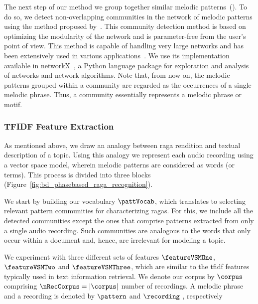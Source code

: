 The next step of our method we group together similar melodic patterns~(). To do so, we detect non-overlapping communities in the network of melodic patterns using the method proposed by~\cite{blondel2008fast}. This community detection method is based on optimizing the modularity of the network and is parameter-free from the user's point of view. This method is capable of handling very large networks and has been extensively used in various applications~\citep{fortunato2010community}. We use its implementation available in networkX~\citep{hagberg-2008-exploring}, a Python language package for exploration and analysis of networks and network algorithms. Note that, from now on, the melodic patterns grouped within a community are regarded as the occurrences of a single melodic phrase. Thus, a community essentially represents a melodic phrase or motif.


\subsubsection{TFIDF Feature Extraction}
\label{sec:vsm_feature_extraction_TFID_computation}

As mentioned above, we draw an analogy between \gls{raga} rendition and textual description of a topic. Using this analogy we represent each audio recording using a vector space model, wherein melodic patterns are considered as words (or terms). This process is divided into three blocks (Figure~\ref{fig:bd_phasebased_raga_recognition}).

We start by building our vocabulary $\pattVocab$, which translates to selecting relevant pattern communities for characterizing \glspl{raga}. For this, we include all the detected communities except the ones that comprise patterns extracted from only a single audio recording. Such communities are analogous to the words that only occur within a document and, hence, are irrelevant for modeling a topic.%

We experiment with three different sets of features $\featureVSMOne$, $\featureVSMTwo$ and $\featureVSMThree$, which are similar to the \gls{tfidf} features typically used in text information retrieval. We denote our corpus by $\corpus$  comprising $\nRecCorpus = |\corpus|$ number of recordings. A melodic phrase and a recording is denoted by $\pattern$ and $\recording$ , respectively

